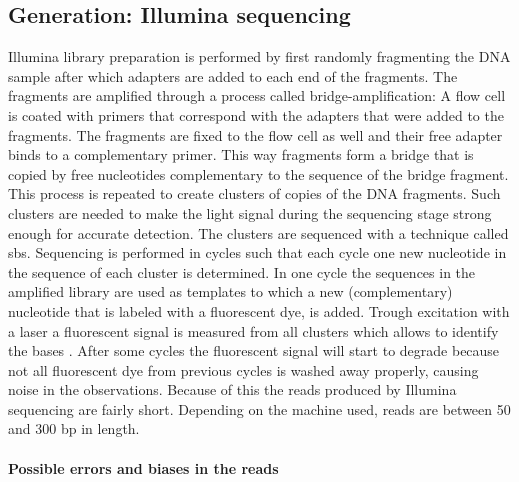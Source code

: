 \subsection{Generation: Illumina sequencing}

Illumina library preparation is performed by first randomly fragmenting the DNA sample after which adapters are added to each end of the fragments. The fragments are amplified through a process called bridge-amplification: A flow cell is coated with primers that correspond with the adapters that were added to the fragments. The fragments are fixed to the flow cell as well and their free adapter binds to a complementary primer. This way fragments form a bridge that is copied by free nucleotides complementary to the sequence of the bridge fragment. This process is repeated to create clusters of copies of the DNA fragments. Such clusters are needed to make the light signal during the sequencing stage strong enough for accurate detection. The clusters are sequenced with a technique called \gls{sbs}. Sequencing is performed in cycles such that each cycle one new nucleotide in the sequence of each cluster is determined. In one cycle the sequences in the amplified library are used as templates to which a new (complementary) nucleotide that is labeled with a fluorescent dye, is added. Trough excitation with a laser a fluorescent signal is measured from all clusters which allows to identify the bases \cite{Illumina2010}.
After some cycles the fluorescent signal will start to degrade because not all fluorescent dye from previous cycles is washed away properly, causing noise in the observations. Because of this the reads produced by Illumina sequencing are fairly short. Depending on the machine used, reads are between 50 and 300 \gls{bp} in length.

\paragraph{Possible errors and biases in the reads}


